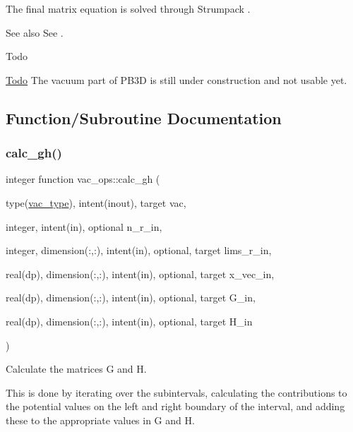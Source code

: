 The final matrix equation is solved through Strumpack \cite{Meiser2016}.

\begin{DoxySeeAlso}{See also}
See \cite{Weyens3D}.
\end{DoxySeeAlso}
\begin{DoxyRefDesc}{Todo}
\item[\hyperlink{todo__todo000001}{Todo}]The vacuum part of P\+B3D is still under construction and not usable yet. \end{DoxyRefDesc}


\subsection{Function/\+Subroutine Documentation}
\mbox{\label{namespacevac__ops_a7e3f92fbe9fa6cf3de6ac301676b96d1}} 
\subsubsection{\texorpdfstring{calc\+\_\+gh()}{calc\_gh()}}
{\footnotesize\ttfamily integer function vac\+\_\+ops\+::calc\+\_\+gh (\begin{DoxyParamCaption}\item[{type(\hyperlink{structvac__vars_1_1vac__type}{vac\+\_\+type}), intent(inout), target}]{vac,  }\item[{integer, intent(in), optional}]{n\+\_\+r\+\_\+in,  }\item[{integer, dimension(\+:,\+:), intent(in), optional, target}]{lims\+\_\+r\+\_\+in,  }\item[{real(dp), dimension(\+:,\+:), intent(in), optional, target}]{x\+\_\+vec\+\_\+in,  }\item[{real(dp), dimension(\+:,\+:), intent(in), optional, target}]{G\+\_\+in,  }\item[{real(dp), dimension(\+:,\+:), intent(in), optional, target}]{H\+\_\+in }\end{DoxyParamCaption})}



Calculate the matrices {\ttfamily G} and {\ttfamily H}. 

This is done by iterating over the subintervals, calculating the contributions to the potential values on the left and right boundary of the interval, and adding these to the appropriate values in G and H.


